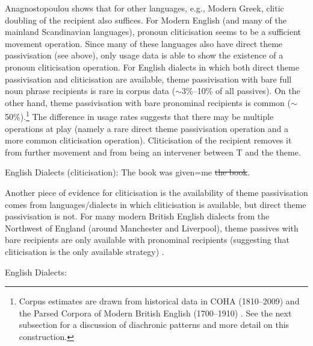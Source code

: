 Anagnostopoulou shows that for other languages, e.g., Modern Greek, clitic doubling of the recipient also suffices. For Modern English (and many of the mainland Scandinavian languages), pronoun cliticisation seems to be a sufficient movement operation. Since many of these languages also have direct theme passivisation (see above), only usage data is able to show the existence of a pronoun cliticisation operation. For English dialects in which both direct theme passivisation and cliticisation are available, theme passivisation with bare full noun phrase recipients is rare in corpus data ($\sim$3\%--10\% of all passives). On the other hand, theme passivisation with bare pronominal recipients is common ($\sim$50\%).\footnote{Corpus estimates are drawn from historical data in COHA (1810--2009) \citep{Davies.2010} and the Parsed Corpora of Modern British English (1700--1910) \citep{Kroch.2010}. See the next subsection for a discussion of diachronic patterns and more detail on this construction.} The difference in usage rates suggests that there may be multiple operations at play (namely a rare direct theme passivisation operation and a more common cliticisation operation). Cliticisation of the recipient removes it from further movement and from being an intervener between T and the theme.

\begin{exe}
	\ex English Dialects (cliticisation): The book was given=me \sout{the book}.\label{ex:en-clitic}
\end{exe}

Another piece of evidence for cliticisation is the availability of theme passivisation comes from languages/dialects in which cliticisation is available, but direct theme passivisation is not. For many modern British English dialects from the Northwest of England (around Manchester and Liverpool), theme passives with bare recipients are only available with pronominal recipients (suggesting that cliticisation is the only available strategy) \citep{Haddican.2010,Myler.2011,Haddican.2012,Biggs.2015}.

\begin{exe}
	\ex English Dialects:\label{ex:endial-prosens}
	\begin{xlist}
	\end{xlist}
\end{exe}


